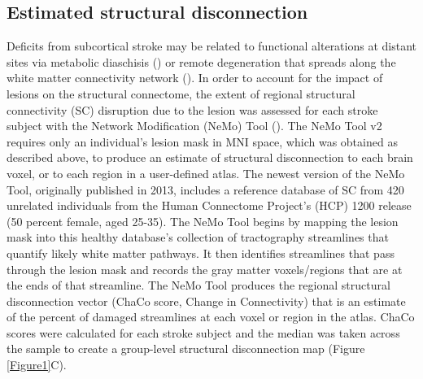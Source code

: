 \documentclass[phd,tocprelim]{cornell}
\begin{document}
	\subsection{Estimated structural disconnection}
	Deficits from subcortical stroke may be related to functional alterations at distant sites via metabolic diaschisis (\cite{Hillis2002-dz, Corbetta2015-ez}) or remote degeneration that spreads along the white matter connectivity network (\cite{Duering2015-iv, Cheng2015-jq}). In order to account for the impact of lesions on the structural connectome, the extent of regional structural connectivity (SC) disruption due to the lesion was assessed for each stroke subject with the Network Modification (NeMo) Tool (\cite{Kuceyeski2013-nk}). The NeMo Tool v2 requires only an individual’s lesion mask in MNI space, which was obtained as described above, to produce an estimate of structural disconnection to each brain voxel, or to each region in a user-defined atlas. The newest version of the NeMo Tool, originally published in 2013, includes a reference database of SC from 420 unrelated individuals from the Human Connectome Project’s (HCP) 1200 release (50 percent female, aged 25-35). The NeMo Tool begins by mapping the lesion mask into this healthy database’s collection of tractography streamlines that quantify likely white matter pathways. It then identifies streamlines that pass through the lesion mask and records the gray matter voxels/regions that are at the ends of that streamline. The NeMo Tool produces the regional structural disconnection vector (ChaCo score, Change in Connectivity) that is an estimate of the percent of damaged streamlines at each voxel or region in the atlas. ChaCo scores were calculated for each stroke subject and the median was taken across the sample to create a group-level structural disconnection map (Figure \ref{Figure1}C).
\end{document}
